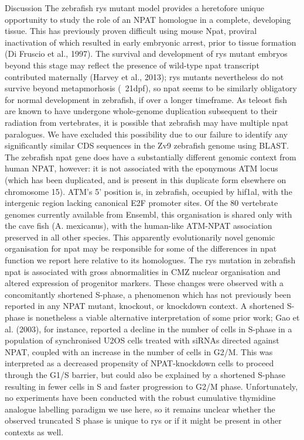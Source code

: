 Discussion
The zebrafish rys mutant model provides a heretofore unique opportunity to study the role of an NPAT homologue in a complete, developing tissue. This has previously proven difficult using mouse Npat, proviral inactivation of which resulted in early embryonic arrest, prior to tissue formation (Di Fruscio et al., 1997). The survival and development of rys mutant embryos beyond this stage may reflect the presence of wild-type npat transcript contributed maternally (Harvey et al., 2013); rys mutants nevertheless do not survive beyond metapmorhosis (~21dpf), so npat seems to be similarly obligatory for normal development in zebrafish, if over a longer timeframe.
As teleost fish are known to have undergone whole-genome duplication subsequent to their radiation from vertebrates, it is possible that zebrafish may have multiple npat paralogues. We have excluded this possibility due to our failure to identify any significantly similar CDS sequences in the Zv9 zebrafish genome using BLAST. The zebrafish npat gene does have a substantially different genomic context from human NPAT, however: it is not associated with the eponymous ATM locus (which has been duplicated, and is present in this duplicate form elsewhere on chromosome 15). ATM’s 5’ position is, in zebrafish, occupied by hif1al, with the intergenic region lacking canonical E2F promoter sites. Of the 80 vertebrate genomes currently available from Ensembl, this organisation is shared only with the cave fish (A. mexicanus), with the human-like ATM-NPAT association preserved in all other species. This apparently evolutionarily novel genomic organisation for npat may be responsible for some of the differences in npat function we report here relative to its homologues.
The rys mutation in zebrafish npat is associated with gross abnormalities in CMZ nuclear organisation and altered expression of progenitor markers. These changes were observed with a concomitantly shortened S-phase, a phenomenon which has not previously been reported in any NPAT mutant, knockout, or knockdown context. A shortened S-phase is nonetheless a viable alternative interpretation of some prior work; Gao et al. (2003), for instance, reported a decline in the number of cells in S-phase in a population of synchronised U2OS cells treated with siRNAs directed against NPAT, coupled with an increase in the number of cells in G2/M. This was interpreted as a decreased propensity of NPAT-knockdown cells to proceed through the G1/S barrier, but could also be explained by a shortened S-phase resulting in fewer cells in S and faster progression to G2/M phase. Unfortunately, no experiments have been conducted with the robust cumulative thymidine analogue labelling paradigm we use here, so it remains unclear whether the observed truncated S phase is unique to rys or if it might be present in other contexts as well.
